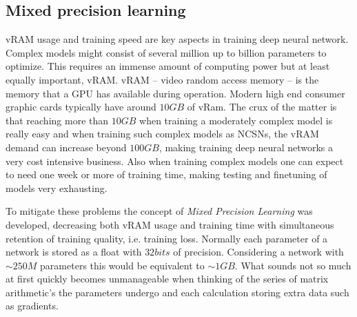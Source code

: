 \subsection{Mixed precision learning} \label{sec:5.3.1}
vRAM usage and training speed are key aspects in training deep neural network. Complex models might consist of several million up to billion parameters to optimize. This requires an immense amount of computing power but at least equally important, vRAM. vRAM – video random access memory – is the memory that a GPU has available during operation. Modern high end consumer graphic cards typically have around $10GB$ of vRam. The crux of the matter is that reaching more than $10GB$ when training a moderately complex model is really easy and when training such complex models as NCSNs, the vRAM demand can increase beyond $100GB$, making training deep neural networks a very cost intensive business. Also when training complex models one can expect to need one week or more of training time, making testing and finetuning of models very exhausting.

To mitigate these problems the concept of \textit{Mixed Precision Learning} \cite{mixed_prec} was developed, decreasing both vRAM usage and training time with simultaneous retention of training quality, i.e. training loss. Normally each parameter of a network is stored as a float with $32bits$ of precision. Considering a network with $\sim250M$ parameters this would be equivalent to $\sim1GB$. What sounds not so much at first quickly becomes unmanageable when thinking of the series of matrix arithmetic's the parameters undergo and each calculation storing extra data such as gradients. 

